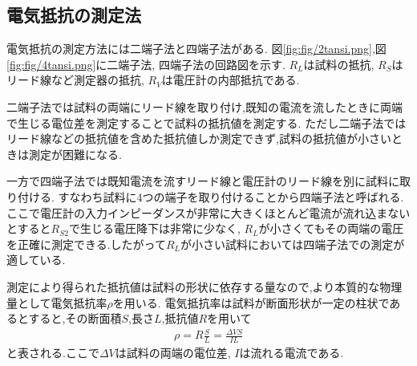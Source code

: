 \subsection{電気抵抗の測定法}
電気抵抗の測定方法には二端子法と四端子法がある.
図\ref{fig:fig/2tansi.png},図\ref{fig:fig/4tansi.png}に二端子法, 四端子法の回路図を示す.
$R_L$は試料の抵抗, $R_S$はリード線など測定器の抵抗, $R_V$は電圧計の内部抵抗である.

二端子法では試料の両端にリード線を取り付け,既知の電流を流したときに両端で生じる電位差を測定することで試料の抵抗値を測定する.
ただし二端子法ではリード線などの抵抗値を含めた抵抗値しか測定できず,試料の抵抗値が小さいときは測定が困難になる.

一方で四端子法では既知電流を流すリード線と電圧計のリード線を別に試料に取り付ける.
すなわち試料に4つの端子を取り付けることから四端子法と呼ばれる.
ここで電圧計の入力インピーダンスが非常に大きくほとんど電流が流れ込まないとすると$R_{S2}$で生じる電圧降下は非常に少なく,
$R_L$が小さくてもその両端の電圧を正確に測定できる.したがって$R_L$が小さい試料においては四端子法での測定が適している.

測定により得られた抵抗値は試料の形状に依存する量なので,より本質的な物理量として電気抵抗率$\rho$を用いる.
電気抵抗率は試料が断面形状が一定の柱状であるとすると,その断面積$S$,長さ$L$,抵抗値$R$を用いて
\begin{align}
  \label{equ:rho}
  \rho=R\frac{S}{L}=\frac{\Delta VS}{IL}
\end{align}
と表される.ここで$\Delta V$は試料の両端の電位差, $I$は流れる電流である.
\clearpage
{}
